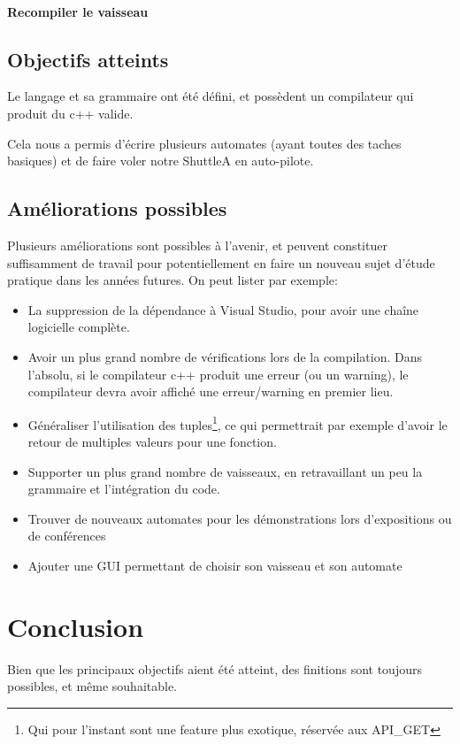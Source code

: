 \documentclass[a4paper,11pt]{article}
\begin{document}
        \paragraph{Recompiler le vaisseau}
            

    \subsection{Objectifs atteints}
        Le langage et sa grammaire ont été défini, et possèdent un compilateur qui produit du c++ valide.
        
        Cela nous a permis d'écrire plusieurs automates (ayant toutes des taches basiques) et de faire voler notre ShuttleA en auto-pilote.

    \subsection{Améliorations possibles}
        Plusieurs améliorations sont possibles à l'avenir, et peuvent constituer suffisamment de travail pour potentiellement en faire un nouveau sujet d'étude pratique dans les années futures.
        On peut lister par exemple:
        \begin{itemize}
            \item La suppression de la dépendance à Visual Studio, pour avoir une chaîne logicielle complète.
            \item Avoir un plus grand nombre de vérifications lors de la compilation. Dans l'absolu, si le compilateur c++ produit une erreur (ou un warning), le compilateur devra avoir affiché une erreur/warning en premier lieu.
            \item Généraliser l'utilisation des tuples\footnote{Qui pour l'instant sont une feature plus exotique, réservée aux API\_GET}, ce qui permettrait par exemple d'avoir le retour de multiples valeurs pour une fonction.
            \item Supporter un plus grand nombre de vaisseaux, en retravaillant un peu la grammaire et l'intégration du code.
            \item Trouver de nouveaux automates pour les démonstrations lors d'expositions ou de conférences 
            \item Ajouter une GUI permettant de choisir son vaisseau et son automate
        \end{itemize}

\section{Conclusion}
    Bien que les principaux objectifs aient été atteint, des finitions sont toujours possibles, et même souhaitable.
        
\end{document}
